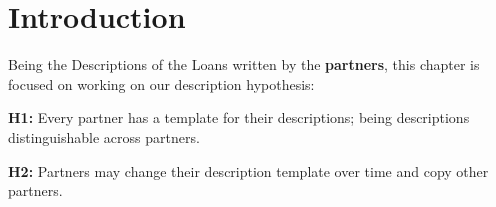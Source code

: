 % 
% 
% 
% 
% 
% 

\section{Introduction}
Being the Descriptions of the Loans written by the \textbf{partners}, this chapter is focused on working on our description hypothesis:
\begin{tcolorbox}
\textbf{H1:} Every partner has a template for their descriptions; being descriptions distinguishable across partners.
\end{tcolorbox}
\begin{tcolorbox}
\textbf{H2:} Partners may change their description template over time and copy other partners.
\end{tcolorbox}

